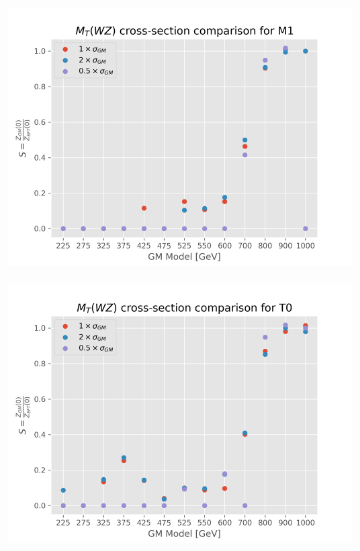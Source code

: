 \documentclass[../Bachelorarbeit.tex]{subfiles}
\begin{document}
\begin{figure}[h]
\begin{subfigure}{0.45\textwidth}
        \includegraphics[width=\textwidth]{Plots/gm_relevanze/MTWZ_comparision_M1.png}
        \caption{}
    \end{subfigure}
    \begin{subfigure}{0.45\textwidth}
        \includegraphics[width=\textwidth]{Plots/gm_relevanze/MTWZ_comparision_T0.png}
        \caption{}
    \end{subfigure}
    \begin{subfigure}{0.45\textwidth}

\end{subfigure}
\end{figure}
\end{document}

